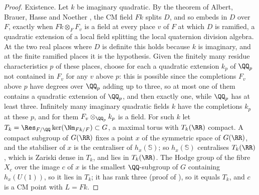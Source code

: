 \begin{proof}
Existence. Let $k$ be imaginary quadratic. By the theorem of Albert, Brauer,
Hasse and Noether \cite[\S1.5]{PR94}, the CM field $Fk$ splits $D$, and so
embeds in $D$ over $F$, exactly when $Fk\otimes_{F}F_{v}$ is a field at
every place $v$ of $F$ at which $D$ is ramified, a quadratic extension of a
local field splitting the local quaternion division algebra. At the two real
places where $D$ is definite this holds because $k$ is imaginary, and at the
finite ramified places it is the hypothesis. Given the finitely many
residue characteristics $p$ of these places, choose for each a quadratic
extension $k_{p}$ of $\QQ_{p}$ not contained in $F_{v}$ for any $v$ above
$p$: this is possible since the completions $F_{v}$ above $p$ have degrees
over $\QQ_{p}$ adding up to three, so at most one of them contains a
quadratic extension of $\QQ_{p}$, and then exactly one, while $\QQ_{p}$ has
at least three. Infinitely many imaginary quadratic fields $k$ have the
completions $k_{p}$ at these $p$, and for them
$F_{v}\otimes_{\QQ_{p}}k_{p}$ is a field. For such $k$ let
$T_{k}=\Res_{F/\QQ}\ker(\Nm_{Fk/F})\subset G$, a maximal torus with
$T_{k}(\RR)$ compact. A compact subgroup of $G(\RR)$ fixes a point $x$ of the
symmetric space of $G(\RR)$, and the stabiliser of $x$ is the centraliser of
$h_{x}(\mathbb{S})$; so $h_{x}(\mathbb{S})$ centralises $T_{k}(\RR)$, which
is Zariski dense in $T_{k}$, and lies in $T_{k}(\RR)$. The Hodge group of
the fibre $X_{c}$ over the image $c$ of $x$ is the smallest $\QQ$-subgroup
of $G$ containing $h_{x}(U(1))$, so it lies in $T_{k}$; it has rank three
(proof of ), so it equals $T_{k}$, and $c$ is a CM
point with $L=Fk$.
\end{proof}

